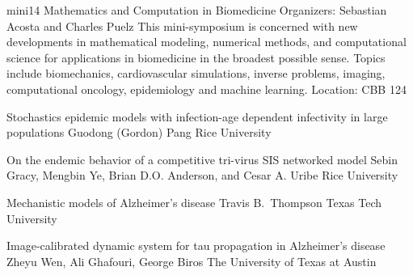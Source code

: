 \mini
{mini14}
{Mathematics and Computation in Biomedicine}
{Organizers: Sebastian Acosta and Charles Puelz}
{This mini-symposium is concerned with new developments in mathematical modeling, numerical methods, and computational science for applications in biomedicine in the broadest possible sense. Topics include biomechanics, cardiovascular simulations, inverse problems, imaging, computational oncology, epidemiology and machine learning.}
{Location: CBB 124}

\begin{talks}
\item\talk
{Stochastics epidemic models with infection-age dependent infectivity in large populations}
{Guodong (Gordon) Pang}
{Rice University}
\item\talk
{On the endemic behavior of a competitive tri-virus SIS networked model}
{Sebin Gracy, Mengbin Ye, Brian D.O. Anderson, and Cesar A. Uribe}
{Rice University}
\item\talk
{Mechanistic models of Alzheimer's disease}
{Travis B.~Thompson}
{Texas Tech University}
\item\talk
{Image-calibrated dynamic system for tau propagation in Alzheimer's disease}
{Zheyu Wen, Ali Ghafouri, George Biros}
{The University of Texas at Austin}
\end{talks}
\room
